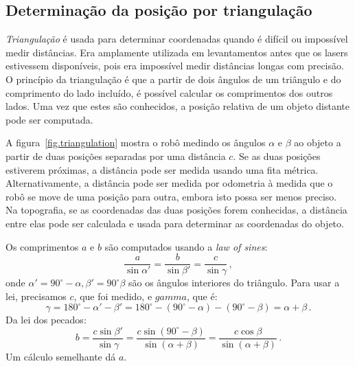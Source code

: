\subsection{Determinação da posição por triangulação}

\emph{Triangulação} é usada para determinar coordenadas quando é difícil ou impossível medir distâncias. Era amplamente utilizada em levantamentos antes que os lasers estivessem disponíveis, pois era impossível medir distâncias longas com precisão. O princípio da triangulação é que a partir de dois ângulos de um triângulo e do comprimento do lado incluído, é possível calcular os comprimentos dos outros lados. Uma vez que estes são conhecidos, a posição relativa de um objeto distante pode ser computada.

A figura~\ref{fig.triangulation} mostra o robô medindo os ângulos $\alpha$ e $\beta$ ao objeto a partir de duas posições separadas por uma distância $c$. Se as duas posições estiverem próximas, a distância pode ser medida usando uma fita métrica. Alternativamente, a distância pode ser medida por odometria à medida que o robô se move de uma posição para outra, embora isto possa ser menos preciso. Na topografia, se as coordenadas das duas posições forem conhecidas, a distância entre elas pode ser calculada e usada para determinar as coordenadas do objeto.

Os comprimentos $a$ e $b$ são computados usando a \emph{law of sines}:
\begin{displaymath}
\frac{a}{\sin\alpha'} = \frac{b}{\sin\beta'} = \frac{c}{\sin\gamma}\,,
\end{displaymath}
onde $\alpha' = 90^\circ{} - \alpha, \beta' = 90^\circ{} \beta$ são os ângulos interiores do triângulo. Para usar a lei, precisamos $c$, que foi medido, e $gamma$, que é:
\begin{displaymath}
\gamma = 180^{\circ}-\alpha'-\beta' = 180^{\circ} - (90^{\circ} -
\alpha) - (90^{\circ} - \beta) = \alpha + \beta\,.
\end{displaymath}
Da lei dos pecados:
\begin{displaymath}
b = \frac{c\sin\beta'}{\sin\gamma} =
\frac{c\sin (90^{\circ} - \beta)}{\sin (\alpha + \beta)} =
\frac{c\cos\beta}{\sin (\alpha + \beta)}\,.
\end{displaymath}
Um cálculo semelhante dá $a$.

